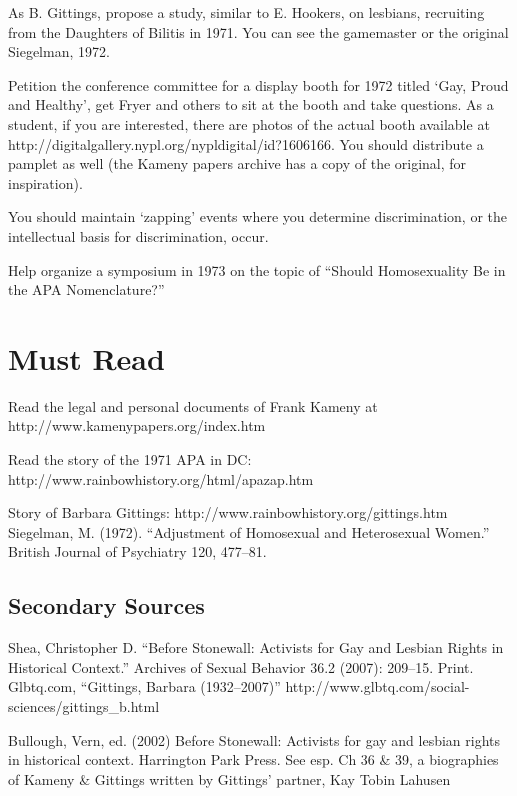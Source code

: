 \begin{refsection}
As B. Gittings, propose a study, similar to E. Hookers, on lesbians, recruiting from the Daughters of Bilitis in 1971. You can see the gamemaster or the original Siegelman, 1972.

Petition the conference committee for a display booth for 1972 titled `Gay, Proud and Healthy', get Fryer and others to sit at the booth and take questions. As a student, if you are interested, there are photos of the actual booth available at http:\slash \slash digitalgallery.nypl.org\slash nypldigital\slash id?1606166. You should distribute a pamplet as well (the Kameny papers archive has a copy of the original, for inspiration).

You should maintain `zapping' events where you determine discrimination, or the intellectual basis for discrimination, occur.

Help organize a symposium in 1973 on the topic of ``Should Homosexuality Be in the APA Nomenclature?''

\section{Must Read}
\label{mustread}

Read the legal and personal documents of Frank Kameny at http:\slash \slash www.kamenypapers.org\slash index.htm

Read the story of the 1971 APA in DC: http:\slash \slash www.rainbowhistory.org\slash html\slash apazap.htm

Story of Barbara Gittings: http:\slash \slash www.rainbowhistory.org\slash gittings.htm
Siegelman, M. (1972). ``Adjustment of Homosexual and Heterosexual Women.'' British Journal of Psychiatry 120, 477--81.

\subsection{Secondary Sources}
\label{secondarysources}

Shea, Christopher D. ``Before Stonewall: Activists for Gay and Lesbian Rights in Historical Context.'' Archives of Sexual Behavior 36.2 (2007): 209--15. Print.
Glbtq.com, ``Gittings, Barbara (1932--2007)'' http:\slash \slash www.glbtq.com\slash social-sciences\slash gittings\_b.html

Bullough, Vern, ed. (2002) Before Stonewall: Activists for gay and lesbian rights in historical context. Harrington Park Press. See esp. Ch 36 \& 39, a biographies of Kameny \& Gittings written by Gittings' partner, Kay Tobin Lahusen


\end{refsection}
